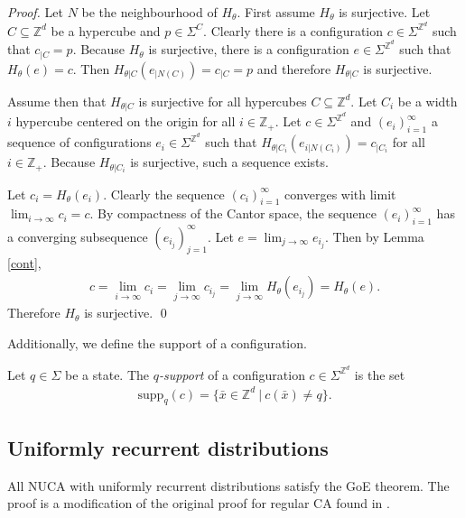 \documentclass[runningheads]{llncs}
\newcommand{\Z}{\mathbb{Z}}
\newcommand{\set}[2]{\{ #1 \: | \: #2 \}}
\newcommand{\confspace}{\Sigma^{\Z^d}}
\begin{document}
\begin{proof}
Let $N$ be the neighbourhood of $H_\theta$. First assume $H_\theta$ is surjective. Let $C \subseteq \Z^d$ be a hypercube and $p \in \Sigma^C$. Clearly there is a configuration $c \in \confspace$ such that $c_{|C} = p$. Because $H_\theta$ is surjective, there is a configuration $e \in \confspace$ such that $H_\theta (e) = c$. Then $H_{\theta |C} (e_{|N(C)} ) = c_{|C} = p$ and therefore $H_{\theta|C}$ is surjective.

Assume then that $H_{\theta|C}$ is surjective for all hypercubes $C \subseteq \Z^d$. Let $C_i$ be a width $i$ hypercube centered on the origin for all $i \in \Z_+$. Let $c \in \confspace$ and $(e_i)_{i=1}^\infty$ a sequence of configurations $e_i \in \confspace$ such that $H_{\theta|C_i}(e_{i|N(C_i )}) = c_{|C_i}$ for all $i \in \Z_+$. Because $H_{\theta|C_i}$ is surjective, such a sequence exists. 

Let $c_i = H_\theta (e_i)$. Clearly the sequence $(c_i)_{i=1}^\infty$ converges with limit $\lim_{i \rightarrow \infty} c_i =c$. By compactness of the Cantor space, the sequence $(e_i)_{i=1}^\infty$ has a converging subsequence $(e_{i_j})_{j=1}^\infty$. Let $e = \lim_{j \rightarrow \infty} e_{i_j}$. Then by Lemma \ref{cont}, 
\begin{align*}
c = \lim_{i\rightarrow \infty} c_i = \lim_{j \rightarrow \infty} c_{i_j} = \lim_{j \rightarrow \infty} H_\theta (e_{i_j}) = H_\theta (e).
\end{align*}
Therefore $H_\theta$ is surjective.
\qed
\end{proof} 

Additionally, we define the support of a configuration.

\begin{definition}
Let $q \in \Sigma$ be a state. The \emph{$q$-support} of a configuration $c \in  \confspace$ is the set
\begin{align*}
\mathrm{supp}_q(c) = \set{\bar{x} \in \Z^d}{c(\bar{x}) \neq q}.
\end{align*}
\end{definition}

\subsection{Uniformly recurrent distributions}

All NUCA with uniformly recurrent distributions satisfy the GoE theorem. The proof is a modification of the original proof for regular CA found in \cite{moore,myhill}.
\end{document}
